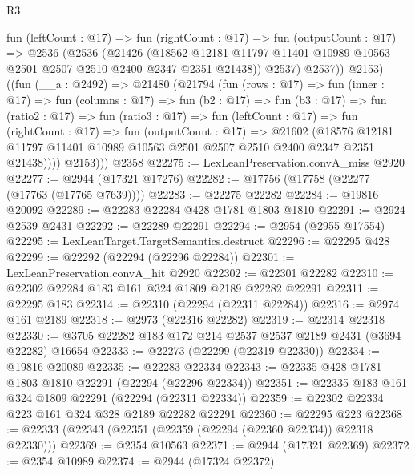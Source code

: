 \begin{lexlean}{R3}
\begin{coremodule}
          fun (leftCount : @17) =>
          fun (rightCount : @17) =>
          fun (outputCount : @17) =>
          @2536
            (@2536
              (@21426
                (@18562
                  @12181
                  @11797
                  @11401
                  @10989
                  @10563
                  @2501
                  @2507
                  @2510
                  @2400
                  @2347
                  @2351
                  @21438))
              @2537)
            @2537))
          @2153)
        ((fun (__a : @2492) =>
        @21480
          (@21794
            (fun (rows : @17) =>
            fun (inner : @17) =>
            fun (columns : @17) =>
            fun (b2 : @17) =>
            fun (b3 : @17) =>
            fun (ratio2 : @17) =>
            fun (ratio3 : @17) =>
            fun (leftCount : @17) =>
            fun (rightCount : @17) =>
            fun (outputCount : @17) =>
            @21602
              (@18576
                @12181
                @11797
                @11401
                @10989
                @10563
                @2501
                @2507
                @2510
                @2400
                @2347
                @2351
                @21438))))
          @2153)))
    @2358
@22275 := LexLeanPreservation.convA_miss @2920
@22277 := @2944 (@17321 @17276)
@22282 := @17756 (@17758 (@22277 (@17763 (@17765 @7639))))
@22283 := @22275 @22282
@22284 := @19816 @20092
@22289 := @22283 @22284 @428 @1781 @1803 @1810
@22291 := @2924 @2539 @2431
@22292 := @22289 @22291
@22294 := @2954 (@2955 @17554)
@22295 := LexLeanTarget.TargetSemantics.destruct
@22296 := @22295 @428
@22299 := @22292 (@22294 (@22296 @22284))
@22301 := LexLeanPreservation.convA_hit @2920
@22302 := @22301 @22282
@22310 := @22302 @22284 @183 @161 @324 @1809 @2189 @22282 @22291
@22311 := @22295 @183
@22314 := @22310 (@22294 (@22311 @22284))
@22316 := @2974 @161 @2189
@22318 := @2973 (@22316 @22282)
@22319 := @22314 @22318
@22330 := @3705 @22282 @183 @172 @214 @2537 @2537 @2189 @2431 (@3694 @22282) @16654
@22333 := @22273 (@22299 (@22319 @22330))
@22334 := @19816 @20089
@22335 := @22283 @22334
@22343 := @22335 @428 @1781 @1803 @1810 @22291 (@22294 (@22296 @22334))
@22351 := @22335 @183 @161 @324 @1809 @22291 (@22294 (@22311 @22334))
@22359 := @22302 @22334 @223 @161 @324 @328 @2189 @22282 @22291
@22360 := @22295 @223
@22368 := @22333 (@22343 (@22351 (@22359 (@22294 (@22360 @22334)) @22318 @22330)))
@22369 := @2354 @10563
@22371 := @2944 (@17321 @22369)
@22372 := @2354 @10989
@22374 := @2944 (@17324 @22372)

\end{coremodule}
\end{lexlean}
